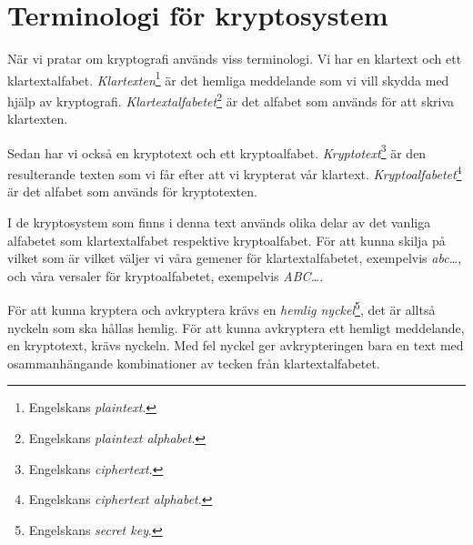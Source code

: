 \section{Terminologi för kryptosystem}
\noindent
När vi pratar om kryptografi används viss terminologi.
Vi har en klartext och ett klartextalfabet.
\emph{Klartexten}\footnote{%
	Engelskans \emph{plaintext}.
} är det hemliga meddelande som vi vill skydda med hjälp av 
kryptografi.
\emph{Klartextalfabetet}\footnote{%
	Engelskans \emph{plaintext alphabet}.
} är det alfabet som används för att skriva klartexten.

Sedan har vi också en kryptotext och ett kryptoalfabet.
\emph{Kryptotext}\footnote{%
	Engelskans \emph{ciphertext}.
} är den resulterande texten som vi får efter att vi 
krypterat vår klartext.
\emph{Kryptoalfabetet}\footnote{%
	Engelskans \emph{ciphertext alphabet}.
} är det alfabet som används för kryptotexten.

I de kryptosystem som finns i denna text används olika delar av det vanliga 
alfabetet som klartextalfabet respektive kryptoalfabet.
För att kunna skilja på vilket som är vilket väljer vi våra gemener för 
klartextalfabetet, exempelvis \emph{abc\dots}, och våra versaler för 
kryptoalfabetet, exempelvis \emph{ABC\dots}.

För att kunna kryptera och avkryptera krävs en \emph{hemlig nyckel}\footnote{%
	Engelskans \emph{secret key}.
}, det är alltså nyckeln som ska hållas hemlig.
För att kunna avkryptera ett hemligt meddelande, en kryptotext, krävs nyckeln.
Med fel nyckel ger avkrypteringen bara en text med osammanhängande 
kombinationer av tecken från klartextalfabetet.

